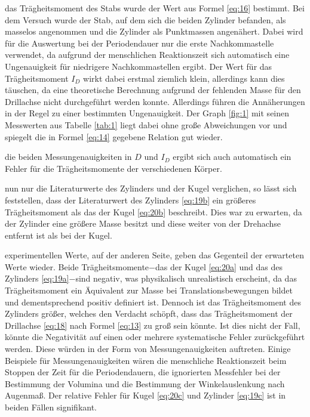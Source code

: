 \justifying das Trägheitsmoment des Stabs wurde der Wert aus Formel \eqref{eq:16} bestimmt.
Bei dem Versuch wurde der Stab, auf dem sich die beiden Zylinder befanden, als masselos angenommen  und
die Zylinder als Punktmassen angenähert. Dabei wird für die Auswertung bei der Periodendauer
nur die erste Nachkommastelle verwendet, da aufgrund der menschlichen Reaktionszeit sich
automatisch eine Ungenauigkeit für niedrigere Nachkommastellen ergibt.
Der Wert für das Trägheitsmoment $I_D$ wirkt dabei erstmal ziemlich klein, allerdings kann
dies täuschen, da eine theoretische Berechnung aufgrund der fehlenden Masse für den 
Drillachse nicht durchgeführt werden konnte. Allerdings führen die Annäherungen in der 
Regel zu einer bestimmten Ungenauigkeit.
Der Graph \ref{fig:1} mit seinen Messwerten aus Tabelle \ref{tab:1} liegt dabei ohne große 
Abweichungen vor und spiegelt die in Formel \eqref{eq:14} gegebene Relation gut wieder.

\justifying die beiden Messungenauigkeiten in $D$ und $I_D$ ergibt
sich auch automatisch ein Fehler für die Trägheitsmomente der verschiedenen Körper.

\justifying nun nur die Literaturwerte des Zylinders und der Kugel verglichen, so lässt sich feststellen, dass
der Literaturwert des Zylinders \eqref{eq:19b} ein größeres Trägheitsmoment als das der Kugel \eqref{eq:20b} beschreibt. Dies war zu erwarten,
da der Zylinder eine größere Masse besitzt und diese weiter von der Drehachse entfernt ist als bei der Kugel. 

\justifying experimentellen Werte, auf der anderen Seite, geben das Gegenteil der erwarteten Werte wieder. Beide Trägheitsmomente$-$das 
der Kugel \eqref{eq:20a} und das des Zylinders \eqref{eq:19a}$-$sind negativ, was physikalisch unrealistisch erscheint, da 
das Trägheitsmoment ein Äquivalent zur Masse bei Translationsbewegungen bildet und dementsprechend positiv definiert ist.
 Dennoch ist das Trägheitsmoment 
des Zylinders größer, welches den Verdacht schöpft, dass das Trägheitsmoment der Drillachse \eqref{eq:18} nach Formel \eqref{eq:13} zu groß 
sein könnte. Ist dies nicht der Fall, könnte die Negativität auf einen oder mehrere systematische Fehler zurückgeführt werden. Diese würden 
in der Form von Messungenauigkeiten auftreten. Einige Beispiele für Messungenauigkeiten wären die menschliche Reaktionszeit beim Stoppen der Zeit
für die Periodendauern, die ignorierten Messfehler bei der Bestimmung der Volumina und die Bestimmung der Winkelauslenkung nach Augenmaß.
Der relative Fehler für Kugel \eqref{eq:20c} und Zylinder \eqref{eq:19c} ist in beiden Fällen signifikant. 

